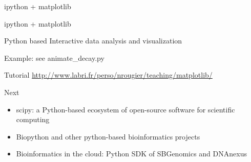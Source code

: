 \documentclass[UTF8]{beamer}
\begin{document}
\begin{frame}[t]{ipython + matplotlib}
  \centerline{\huge{ipython + matplotlib}}
  \vspace{1.5cm}
  \centerline{\huge{Python based Interactive data analysis and visualization}}
  Example: see animate_decay.py
\end{frame}


\begin{frame}[t]{Tutorial}
  \url{http://www.labri.fr/perso/nrougier/teaching/matplotlib/}
\end{frame}

\begin{frame}[t]{Next}
  \begin{itemize}
    \item scipy: a Python-based ecosystem of open-source software for scientific
    computing
    \item Biopython and other python-based bioinformatics projects
    \item Bioinformatics in the cloud: Python SDK of SBGenomics and DNAnexus
  \end{itemize}
\end{frame}
\end{document}
